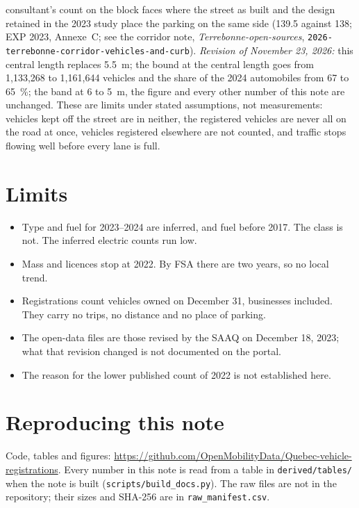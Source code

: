 \documentclass[10.5pt,a4paper]{article}
\begin{document}
consultant's count on the block faces where the street as built and the design retained in the 2023 study place the parking on the same side (139.5 against 138; EXP 2023, Annexe~C; see the corridor note, \emph{Terrebonne-open-sources}, \texttt{2026-terrebonne-corridor-vehicles-and-curb}). \emph{Revision of November 23, 2026:} this central length replaces 5.5~m; the bound at the central length goes from 1{,}133{,}268 to 1{,}161{,}644 vehicles and the share of the 2024 automobiles from 67 to 65~\%; the band at 6 to 5~m, the figure and every other number of this note are unchanged. These are limits under stated assumptions, not measurements: vehicles kept off the street are in neither, the registered vehicles are never all on the road at once, vehicles registered elsewhere are not counted, and traffic stops flowing well before every lane is full.

\section{Limits}
\begin{itemize}
\item Type and fuel for 2023--2024 are inferred, and fuel before 2017. The class is not. The inferred electric counts run low.
\item Mass and licences stop at 2022. By FSA there are two years, so no local trend.
\item Registrations count vehicles owned on December 31, businesses included. They carry no trips, no distance and no place of parking.
\item The open-data files are those revised by the SAAQ on December 18, 2023; what that revision changed is not documented on the portal.
\item The reason for the lower published count of 2022 is not established here.
\end{itemize}

\section*{Reproducing this note}
Code, tables and figures: \url{https://github.com/OpenMobilityData/Quebec-vehicle-registrations}. Every number in this note is read from a table in \texttt{derived/tables/} when the note is built (\texttt{scripts/build\_docs.py}). The raw files are not in the repository; their sizes and SHA-256 are in \texttt{raw\_manifest.csv}.
\end{document}
